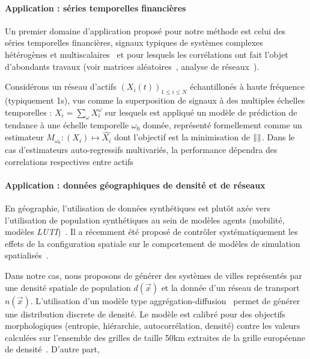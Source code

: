 \paragraph{Application : séries temporelles financières}

Un premier domaine d'application proposé pour notre méthode est celui des séries temporelles financières, signaux typiques de systèmes complexes hétérogènes et multiscalaires~\cite{mantegna2000introduction} et pour lesquels les corrélations ont fait l'objet d'abondants travaux (voir matrices aléatoires~\cite{2009arXiv0910.1205B}, analyse de réseaux~\cite{tumminello2005tool}).

Considérons un réseau d'actifs $(X_i(t))_{1\leq i \leq N}$ échantillonés à haute fréquence (typiquement 1s), vus comme la superposition de signaux à des multiples échelles temporelles : $X_i=\sum_{\omega}{X_i^{\omega}}$ sur lesquels est appliqué un modèle de prédiction de tendance à une échelle temporelle $\omega_0$ donnée, représenté formellement comme un estimateur $M_{\omega_0} : (X_i) \mapsto \hat{X_i}$ dont l'objectif est la minimisation de $\|  \|$. Dans le cas d'estimateurs auto-regressifs multivariés, la performance dépendra des correlations respectives entre actifs



\vspace{-0.4cm}
\paragraph{Application : données géographiques de densité et de réseaux}

En géographie, l'utilisation de données synthétiques est plutôt axée vers l'utilisation de population synthétiques au sein de modèles agents (mobilité, modèles \emph{LUTI})~\cite{pritchard2009advances}. Il a récemment été proposé de contrôler systématiquement les effets de la configuration spatiale sur le comportement de modèles de simulation spatialisés~\cite{cottineau2015revisiting}.

Dans notre cas, nous proposons de générer des systèmes de villes représentés par une densité spatiale de population $d(\vec{x})$ et la donnée d'un réseau de transport $n(\vec{x})$. L'utilisation d'un modèle type aggrégation-diffusion~\cite{batty2006hierarchy} permet de générer une distribution discrete de densité. Le modèle est calibré pour des objectifs morphologiques (entropie, hiérarchie, autocorrélation, densité) contre les valeurs calculées sur l'ensemble des grilles de taille 50km extraites de la grille européenne de densité~\cite{}. %
D'autre part, 








\footnotesize






